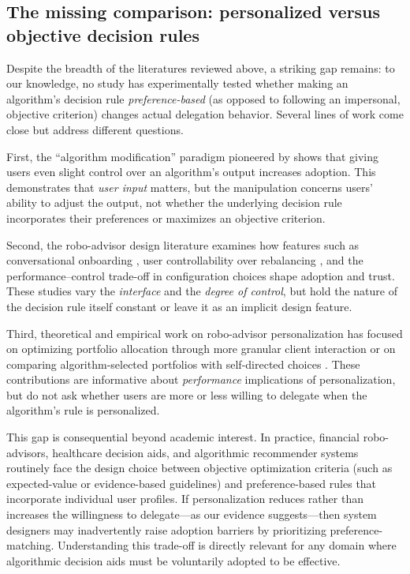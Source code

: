 \documentclass[a4paper, 12pt, fleqn]{article}
\theoremstyle{definition}
\begin{document}
\subsection{The missing comparison: personalized versus objective decision rules}
Despite the breadth of the literatures reviewed above, a striking gap remains: to our knowledge, no study has experimentally tested whether making an algorithm's decision rule \emph{preference-based} (as opposed to following an impersonal, objective criterion) changes actual delegation behavior. Several lines of work come close but address different questions.

First, the ``algorithm modification'' paradigm pioneered by \citet{Dietvorst2018} shows that giving users even slight control over an algorithm's output increases adoption. This demonstrates that \emph{user input} matters, but the manipulation concerns users' ability to adjust the output, not whether the underlying decision rule incorporates their preferences or maximizes an objective criterion.

Second, the robo-advisor design literature examines how features such as conversational onboarding \citep{Hildebrand2021}, user controllability over rebalancing \citep{Kim2025ICIS}, and the performance--control trade-off in configuration choices \citep{Ruehr2020} shape adoption and trust. These studies vary the \emph{interface} and the \emph{degree of control}, but hold the nature of the decision rule itself constant or leave it as an implicit design feature.

Third, theoretical and empirical work on robo-advisor personalization has focused on optimizing portfolio allocation through more granular client interaction \citep{Capponi2022} or on comparing algorithm-selected portfolios with self-directed choices \citep{BouluReshef2026}. These contributions are informative about \emph{performance} implications of personalization, but do not ask whether users are more or less willing to delegate when the algorithm's rule is personalized.

This gap is consequential beyond academic interest. In practice, financial robo-advisors, healthcare decision aids, and algorithmic recommender systems routinely face the design choice between objective optimization criteria (such as expected-value or evidence-based guidelines) and preference-based rules that incorporate individual user profiles. If personalization reduces rather than increases the willingness to delegate---as our evidence suggests---then system designers may inadvertently raise adoption barriers by prioritizing preference-matching. Understanding this trade-off is directly relevant for any domain where algorithmic decision aids must be voluntarily adopted to be effective.
\end{document}
